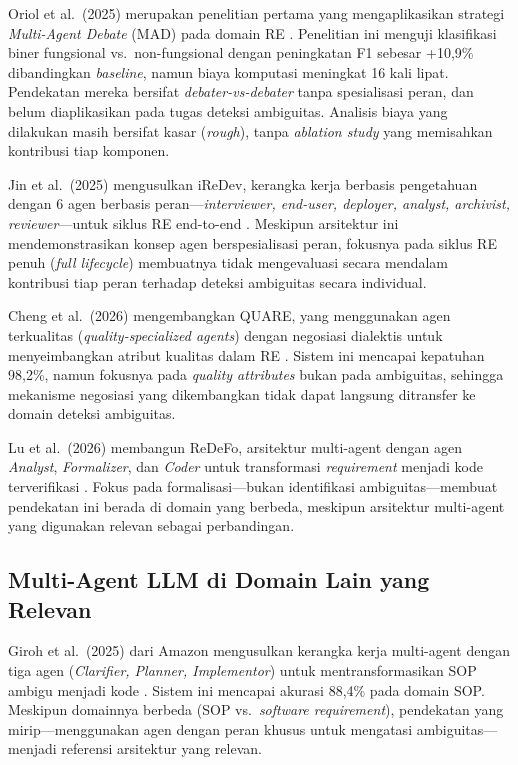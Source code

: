 Oriol et al.\ (2025) merupakan penelitian pertama yang mengaplikasikan strategi \textit{Multi-Agent Debate} (MAD) pada domain RE \cite{oriol2025}. Penelitian ini menguji klasifikasi biner fungsional vs.\ non-fungsional dengan peningkatan F1 sebesar +10,9\% dibandingkan \textit{baseline}, namun biaya komputasi meningkat 16 kali lipat. Pendekatan mereka bersifat \textit{debater-vs-debater} tanpa spesialisasi peran, dan belum diaplikasikan pada tugas deteksi ambiguitas. Analisis biaya yang dilakukan masih bersifat kasar (\textit{rough}), tanpa \textit{ablation study} yang memisahkan kontribusi tiap komponen.

Jin et al.\ (2025) mengusulkan iReDev, kerangka kerja berbasis pengetahuan dengan 6 agen berbasis peran—\textit{interviewer, end-user, deployer, analyst, archivist, reviewer}—untuk siklus RE end-to-end \cite{jin2025}. Meskipun arsitektur ini mendemonstrasikan konsep agen berspesialisasi peran, fokusnya pada siklus RE penuh (\textit{full lifecycle}) membuatnya tidak mengevaluasi secara mendalam kontribusi tiap peran terhadap deteksi ambiguitas secara individual.

Cheng et al.\ (2026) mengembangkan QUARE, yang menggunakan agen terkualitas (\textit{quality-specialized agents}) dengan negosiasi dialektis untuk menyeimbangkan atribut kualitas dalam RE \cite{cheng2026}. Sistem ini mencapai kepatuhan 98,2\%, namun fokusnya pada \textit{quality attributes} bukan pada ambiguitas, sehingga mekanisme negosiasi yang dikembangkan tidak dapat langsung ditransfer ke domain deteksi ambiguitas.

Lu et al.\ (2026) membangun ReDeFo, arsitektur multi-agent dengan agen \textit{Analyst}, \textit{Formalizer}, dan \textit{Coder} untuk transformasi \textit{requirement} menjadi kode terverifikasi \cite{lu2026}. Fokus pada formalisasi—bukan identifikasi ambiguitas—membuat pendekatan ini berada di domain yang berbeda, meskipun arsitektur multi-agent yang digunakan relevan sebagai perbandingan.

\subsection{Multi-Agent LLM di Domain Lain yang Relevan}

Giroh et al.\ (2025) dari Amazon mengusulkan kerangka kerja multi-agent dengan tiga agen (\textit{Clarifier, Planner, Implementor}) untuk mentransformasikan SOP ambigu menjadi kode \cite{giroh2025}. Sistem ini mencapai akurasi 88,4\% pada domain SOP. Meskipun domainnya berbeda (SOP vs.\ \textit{software requirement}), pendekatan yang mirip—menggunakan agen dengan peran khusus untuk mengatasi ambiguitas—menjadi referensi arsitektur yang relevan.

